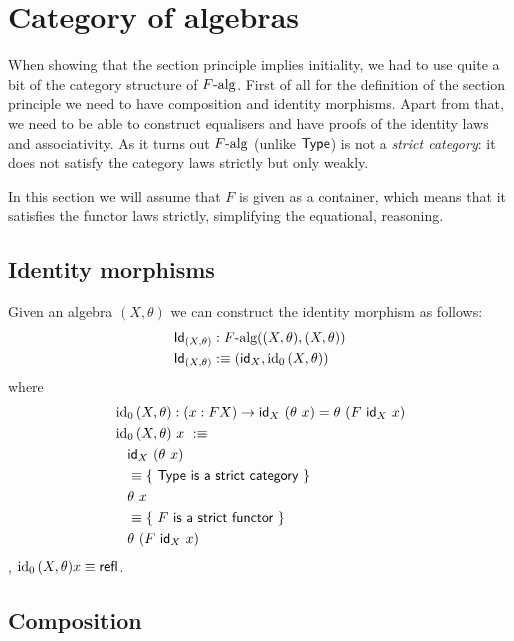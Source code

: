 \documentclass[a4paper,10pt]{report}
\begin{document}
\section{Category of algebras}
\label{sec:oitalgcat}

When showing that the section principle implies initiality, we had to
use quite a bit of the category structure of $F\mbox{-alg}$. First of
all for the definition of the section principle we need to have
composition and identity morphisms. Apart from that, we need to be
able to construct equalisers and have proofs of the identity laws and
associativity. As it turns out $F\mbox{-alg}$ (unlike $\mathsf{Type}$) is not a
\emph{strict category}: it does not satisfy the category laws strictly
but only weakly.

In this section we will assume that $F$ is given as a container, which
means that it satisfies the functor laws strictly, simplifying the
equational, reasoning.

\subsection{Identity morphisms}

Given an algebra $(X,\theta)$ we can construct the identity morphism as follows:
%
\begin{align*}
  &\mathsf{Id}_{(X,\theta)} : F\mbox{-alg}((X,\theta),(X,\theta)) \\
  &\mathsf{Id}_{(X,\theta)} :\equiv (\mathsf{id}_{X} , \operatorname*{id_0}{(X,\theta)})
\end{align*}
%
where
%
\begin{align*}
  &\ido{(X,\theta)} : (x : FX) \to \id{X}\ (\theta\ x) = \theta\ (F\ \id{X}\ x) \\
  &\ido{(X,\theta)}\ x\ \ddefeq \\
  &\ \ \ \id{X}\ (\theta\ x) \\
  &\ \ \ \defeq \reasontext{$\Type$ is a strict category} \\
  &\ \ \ \theta\ x \\
  &\ \ \ \defeq \reasontext{$F$ is a strict functor} \\
  &\ \ \ \theta\ (F\ \id{X}\ x)
\end{align*}
%
\ie, $\operatorname*{id_0}{(X,\theta)} x \equiv \operatorname{\mathsf{refl}}$.

\subsection{Composition}
\end{document}
